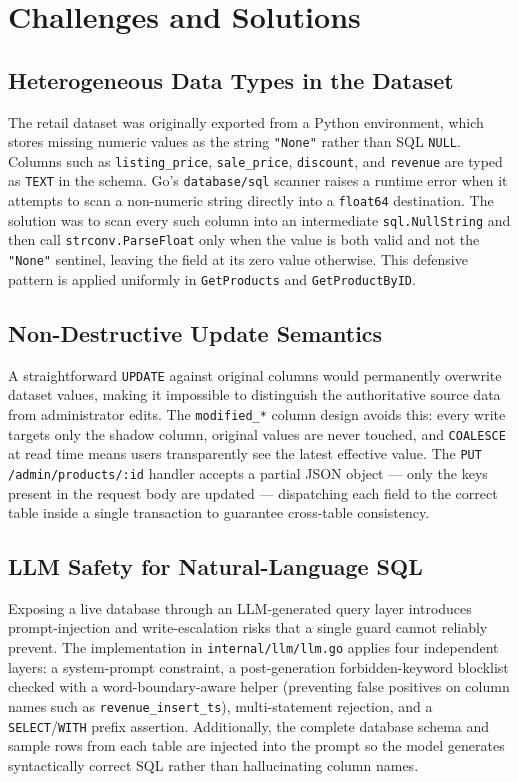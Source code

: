 \documentclass[8pt,a4paper]{article}
\begin{document}
\section{Challenges and Solutions}

\subsection{Heterogeneous Data Types in the Dataset}
The retail dataset was originally exported from a Python environment, which stores missing numeric values as the string \texttt{"None"} rather than SQL \texttt{NULL}. Columns such as \texttt{listing\_price}, \texttt{sale\_price}, \texttt{discount}, and \texttt{revenue} are typed as \texttt{TEXT} in the schema. Go's \texttt{database/sql} scanner raises a runtime error when it attempts to scan a non-numeric string directly into a \texttt{float64} destination. The solution was to scan every such column into an intermediate \texttt{sql.NullString} and then call \texttt{strconv.ParseFloat} only when the value is both valid and not the \texttt{"None"} sentinel, leaving the field at its zero value otherwise. This defensive pattern is applied uniformly in \texttt{GetProducts} and \texttt{GetProductByID}.

\subsection{Non-Destructive Update Semantics}
A straightforward \texttt{UPDATE} against original columns would permanently overwrite dataset values, making it impossible to distinguish the authoritative source data from administrator edits. The \texttt{modified\_*} column design avoids this: every write targets only the shadow column, original values are never touched, and \texttt{COALESCE} at read time means users transparently see the latest effective value. The \texttt{PUT /admin/products/:id} handler accepts a partial JSON object — only the keys present in the request body are updated — dispatching each field to the correct table inside a single transaction to guarantee cross-table consistency.

\subsection{LLM Safety for Natural-Language SQL}
Exposing a live database through an LLM-generated query layer introduces prompt-injection and write-escalation risks that a single guard cannot reliably prevent. The implementation in \texttt{internal/llm/llm.go} applies four independent layers: a system-prompt constraint, a post-generation forbidden-keyword blocklist checked with a word-boundary-aware helper (preventing false positives on column names such as \texttt{revenue\_insert\_ts}), multi-statement rejection, and a \texttt{SELECT}/\texttt{WITH} prefix assertion. Additionally, the complete database schema and sample rows from each table are injected into the prompt so the model generates syntactically correct SQL rather than hallucinating column names.
\end{document}
